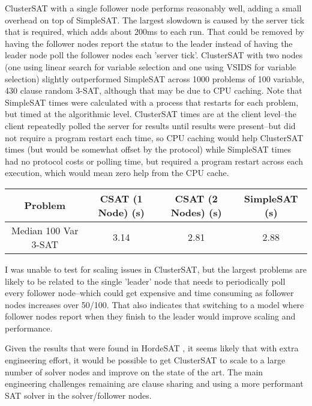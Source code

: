 \documentclass[10pt]{article}
\begin{document}
  ClusterSAT with a single follower node performs reasonably well, adding a small overhead on top of SimpleSAT.  The largest slowdown is caused by the server tick that is required, which adds about 200ms to 
  each run.   That could be removed by having the follower nodes report the status to the leader instead of having the leader node poll the follower nodes each 'server tick'.  ClusterSAT with two nodes (one using linear search for variable selection and one using VSIDS for variable selection) slightly outperformed SimpleSAT across 1000 problems of 100 variable, 430 clause random 3-SAT, although that may be due to CPU caching.  Note that SimpleSAT times were calculated with a process that restarts for each problem, but timed at the algorithmic level.  ClusterSAT times are at the client level--the client repeatedly polled the server for results until results were present--but did not require a program restart each time, so CPU caching would help ClusterSAT times (but would be somewhat offset by the protocol) while SimpleSAT times had no protocol costs or polling time, but required a program restart across each execution, which would mean zero help from the CPU cache.
  
  \begin{center}
 \begin{tabular}{||c c c c||} 
 \hline
 Problem & CSAT (1 Node) (s) & CSAT (2 Nodes) (s) & SimpleSAT (s) \\ [0.5ex] 
 \hline\hline
Median 100 Var 3-SAT & 3.14 & 2.81 & 2.88 \\ 
 \hline
\end{tabular}
\end{center}
  
  I was unable to test for scaling issues in ClusterSAT, but the largest problems are likely to be related to the single 'leader' node that needs to periodically poll every follower node--which could get expensive and time consuming as follower nodes increases over 50/100.  That also indicates that switching to a model where follower nodes report when they finish to the leader would improve scaling and performance.
  
  Given the results that were found in HordeSAT \cite{hordesat}, it seems likely that with extra engineering effort, it would be possible to get ClusterSAT to scale to a large number of solver nodes and improve on the state of the art.  The main engineering challenges remaining are clause sharing and using a more performant SAT solver in the solver/follower nodes.
  
\end{document}
